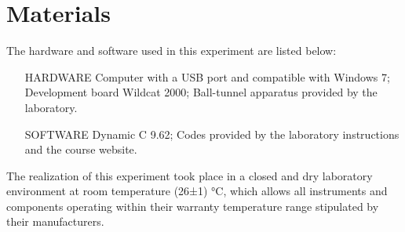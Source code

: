 \section{Materials}

The hardware and software used in this experiment are listed below:

\begin{enumerate}
\item[HARDWARE]
Computer with a USB port and compatible with Windows 7;
Development board Wildcat 2000;
Ball-tunnel apparatus provided by the laboratory.
\\
\item[SOFTWARE]
Dynamic C 9.62;
Codes provided by the laboratory instructions and the course website.
\\
\end{enumerate}
The realization of this experiment took place in a closed and dry laboratory environment at room temperature (26±1)  °C, which allows all instruments and components operating within their warranty temperature range stipulated by their manufacturers.
